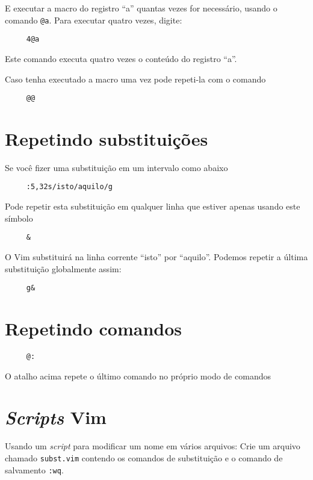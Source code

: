 E executar a macro do registro ``a'' quantas vezes for necessário,
usando o comando \verb|@a|. Para executar quatro vezes, digite:

\begin{verbatim}
     4@a
\end{verbatim}

Este comando executa quatro vezes o conteúdo do registro ``a''.

Caso tenha executado a macro uma vez pode repeti-la com o comando

\begin{verbatim}
     @@
\end{verbatim}

\section{Repetindo substituições }
Se você fizer uma substituição em um intervalo como abaixo

\begin{verbatim}
     :5,32s/isto/aquilo/g
\end{verbatim}

Pode repetir esta substituição em qualquer linha que estiver apenas usando este símbolo

\begin{verbatim}
     &
\end{verbatim}

O Vim substituirá na linha corrente ``isto'' por ``aquilo''. Podemos
repetir a última substituição globalmente assim:
   
\begin{verbatim}
     g&
\end{verbatim}

\section{Repetindo comandos}\label{Repetindo comandos}

\begin{verbatim}
     @:
\end{verbatim}

O atalho acima repete o último comando no próprio modo de comandos

\section{{\em Scripts} Vim}\label{Scripts Vim}
Usando um {\em script} para modificar um nome em vários arquivos: 
Crie um arquivo chamado {\tt subst.vim} contendo os comandos de substituição e o
comando de salvamento {\tt :wq}.

